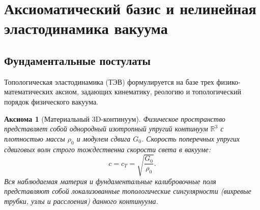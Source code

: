 \documentclass[12pt,a4paper]{article}
\newtheorem{axiom}{Аксиома}
\theoremstyle{definition}
\theoremstyle{remark}
\begin{document}

\section{Аксиоматический базис и нелинейная эластодинамика вакуума}
\label{sec:axiomatics}

\subsection{Фундаментальные постулаты}
Топологическая эластодинамика (ТЭВ) формулируется на базе трех физико-математических аксиом, задающих кинематику, реологию и топологический порядок физического вакуума.

\begin{axiom}[Материальный 3D-континуум]
	Физическое пространство представляет собой однородный изотропный упругий континуум $\mathbb{R}^3$ с плотностью массы $\rho_0$ и модулем сдвига $G_0$. Скорость поперечных упругих сдвиговых волн строго тождественна скорости света в вакууме:
	\begin{equation}
		c = c_T = \sqrt{\frac{G_0}{\rho_0}}.
		\label{eq:shear_speed}
	\end{equation}
	Вся наблюдаемая материя и фундаментальные калибровочные поля представляют собой локализованные топологические сингулярности (вихревые трубки, узлы и расслоения) данного континуума.
\end{axiom}
\end{document}
